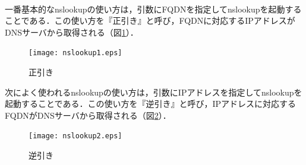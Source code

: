 \\

一番基本的なnslookupの使い方は，引数にFQDNを指定してnslookupを起動することである．この使い方を『正引き』と呼び，FQDNに対応するIPアドレスがDNSサーバから取得される（図\ref{fig:nslookup1}）．

\begin{figure}[htb]
  \begin{center}
    \texttt{[image: nslookup1.eps]}　
  \end{center}
  \caption{正引き}
  \label{fig:nslookup1}
\end{figure}

次によく使われるnslookupの使い方は，引数にIPアドレスを指定してnslookupを起動することである．この使い方を『逆引き』と呼び，IPアドレスに対応するFQDNがDNSサーバから取得される（図\ref{fig:nslookup2}）．

\begin{figure}[htb]
  \begin{center}
    \texttt{[image: nslookup2.eps]}　
  \end{center}
  \caption{逆引き}
  \label{fig:nslookup2}
\end{figure}

